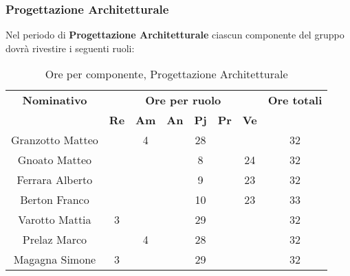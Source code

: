 \subsubsection{Progettazione Architetturale}
Nel periodo di \textbf{Progettazione Architetturale} ciascun componente del gruppo dovrà rivestire i seguenti ruoli:
\begin{table}[H]
	\begin{center}
		\begin{tabular}{|c|c|c|c|c|c|c|c|}
			\hline
			\textbf{Nominativo} & \multicolumn{6}{c|}{\textbf{Ore per ruolo}} & \textbf{Ore totali} \\
			& \textbf{Re} & \textbf{Am} & \textbf{An} & \textbf{Pj} & \textbf{Pr} & \textbf{Ve} & \\
			\hline
			Granzotto Matteo	&		&	 4	&  		&	28	&	 	& 		&	32	\\
			\hline
			Gnoato Matteo		&		&		&		&	8	&		&	24	&	32	\\
			\hline
			Ferrara Alberto		&		&		&		&	9 	&		&	23	& 	32	\\
			\hline
			Berton Franco		&		&		&		&	10	&		&	23	&	33	\\
			\hline
			Varotto Mattia 		&	3	&		&		&	29	&		&		& 	32	\\
			\hline
			Prelaz Marco 		& 		&	4	&		&	28	&		&		&	32	\\
			\hline
			Magagna Simone 		&	3	&		&		&	29	&		& 		&	32	\\
			\hline
		\end{tabular}
	\end{center}
	\caption{Ore per componente, Progettazione Architetturale}
\end{table}
